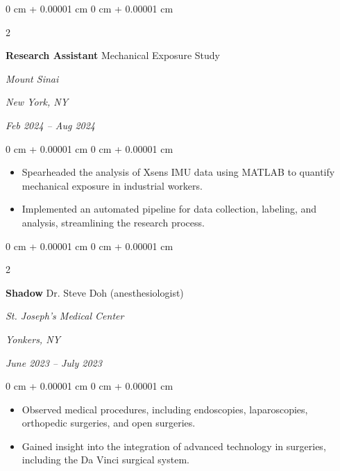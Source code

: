 \documentclass[11pt, letterpaper]{article}
\newenvironment{highlights}{
    \begin{itemize}[
        topsep=0.1 cm,
        parsep=0.1 cm,
        partopsep=0pt,
        itemsep=0pt,
        leftmargin=0 cm + 10pt
    ]
}{
    \end{itemize}
} %
\newenvironment{onecolentry}{
    \begin{adjustwidth}{
        0 cm + 0.00001 cm
    }{
        0 cm + 0.00001 cm
    }
}{
    \end{adjustwidth}
} %
\newenvironment{twocolentry}[2][]{
    \onecolentry
    \def\secondColumn{#2}
    \setcolumnwidth{\fill, 4.5 cm}
    \begin{paracol}{2}
}{
    \switchcolumn \raggedleft \secondColumn
    \end{paracol}
    \endonecolentry
} %
\begin{document}
        \vspace{0.15 cm}

        \begin{twocolentry}{
        \textit{New York, NY}    
            
        \textit{Feb 2024 – Aug 2024}}
            \textbf{Research Assistant}
         \textbar{} \textnormal{Mechanical Exposure Study}    

            \textit{Mount Sinai}
        \end{twocolentry}

        \vspace{0.1 cm}
        \begin{onecolentry}
            \begin{highlights}
                \item Spearheaded the analysis of Xsens IMU data using MATLAB to quantify mechanical exposure in industrial workers.
                \item Implemented an automated pipeline for data collection, labeling, and analysis, streamlining the research process.
            \end{highlights}
        \end{onecolentry}


        \vspace{0.15 cm}

        \begin{twocolentry}{
        \textit{Yonkers, NY}    
            
        \textit{June 2023 – July 2023}}
            \textbf{Shadow}
         \textbar{} \textnormal{Dr. Steve Doh (anesthesiologist)}    

            \textit{St. Joseph’s Medical Center}
        \end{twocolentry}

        \vspace{0.1 cm}
        \begin{onecolentry}
            \begin{highlights}
                \item Observed medical procedures, including endoscopies, laparoscopies, orthopedic surgeries, and open surgeries.
                \item Gained insight into the integration of advanced technology in surgeries, including the Da Vinci surgical system.
            \end{highlights}
        \end{onecolentry}
\end{document}
